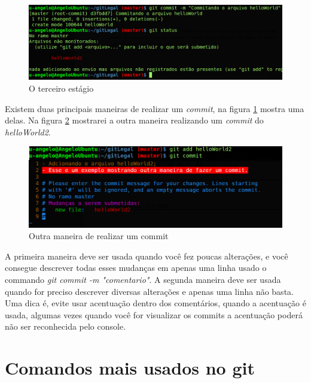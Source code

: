 \documentclass[12pt,openright,oneside,a4paper,english,brazil]{abntex2}
\begin{document}
\begin{figure}[h]
	\caption{\label{estagio3}O terceiro estágio}
	\begin{center}
		\includegraphics[width=1\linewidth]{imagens/estagio3}
	\end{center}
\end{figure}

Existem duas principais maneiras de realizar um \textit{commit}, na figura \ref{estagio3} mostra uma delas. Na figura \ref{commit} mostrarei a outra maneira realizando um \textit{commit} do \textit{helloWorld2}. 

\begin{figure}[h]
	\caption{\label{commit}Outra maneira de realizar um commit}
	\begin{center}
		\includegraphics[width=1\linewidth]{imagens/commit2}
	\end{center}
\end{figure}

A primeira maneira deve ser usada quando você fez poucas alterações, e você consegue descrever todas esses mudanças em apenas uma linha usado o commando \textit{git commit -m "comentario"}. A segunda maneira deve ser usada quando for preciso descrever diversas alterações e apenas uma linha não basta. Uma dica é, evite usar acentuação dentro dos comentários, quando a acentuação é usada, algumas vezes quando você for visualizar os commits a acentuação poderá não ser reconhecida pelo console.

\chapter{Comandos mais usados no git}
\end{document}
